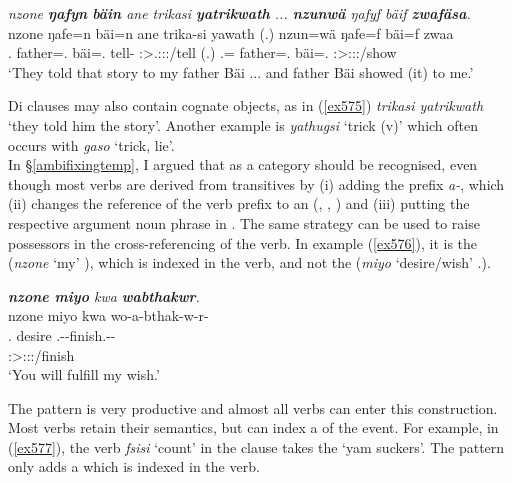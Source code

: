 \begin{exe}
	\ex \emph{nzone \textbf{ŋafyn} \textbf{bäin} ane trikasi \textbf{yatrikwath} ... \textbf{nzunwä} ŋafyf bäif \textbf{zwafäsa}.}\\
	\gll nzone ŋafe=n bäi=n ane trika-si yawath (.) nzun=wä ŋafe=f bäi=f zwaa\\
	\Fsg.\Poss{} father=\Dat.\Sg{} bäi=\Dat.\Sg{} \Dem{} tell-\Nmlz{} \Stpl:\Sbj>\Tsg.\Masc:\Io:\Pst:\Ipfv/tell (.) \Fsg.\Dat=\Emph{} father=\Erg.\Sg{} bäi=\Erg.\Sg{} \Stsg:\Sbj>\Fsg:\Io:\Pst:\Pfv/show\\
	\trans `They told that story to my father Bäi ... and father Bäi showed (it) to me.'\\
	\label{ex575}
\end{exe}

Di clauses may also contain cognate objects, as in (\ref{ex575}) \emph{trikasi yatrikwath} `they told him the story'. Another example is \emph{yathugsi} `trick (v)' which often occurs with \emph{gaso} `trick, lie'.\\

In \S{}\ref{ambifixingtemp}, I argued that  as a category should be recognised, even though most  verbs are derived from transitives by (i) adding the  prefix \emph{a-}, which (ii) changes the reference of the verb prefix to an  (, , ) and (iii) putting the respective argument noun phrase in  . The same strategy can be used to raise possessors in the cross-referencing of the verb. In example (\ref{ex576}), it is the  (\emph{nzone} `my' \Fsg), which is indexed in the verb, and not the  (\emph{miyo} `desire/wish' \Tsg.\F).

\begin{exe}
	\ex \emph{\textbf{nzone miyo} kwa \textbf{wabthakwr}.}\\
	\glll nzone miyo kwa wo-a-bthak-w-r-\Zero{}\\
	\Fsg.\Poss{} desire \Fut{} \Fsg.\Alph-\Vc-finish.\Ext-\Lk-\Stsg{}\\
	{} {} {} \footnotesize{\Stsg:\Sbj>\Fsg:\Io:\Nonpast:\Ipfv/finish}\\
	\trans `You will fulfill my wish.'
	\label{ex576}
\end{exe}

The  pattern is very productive and almost all  verbs can enter this construction. Most verbs retain their  semantics, but can index a  of the event. For example, in (\ref{ex577}), the verb \emph{fsisi} `count' in the clause takes the  `yam suckers'. The  pattern only adds a  which is indexed in the verb.

